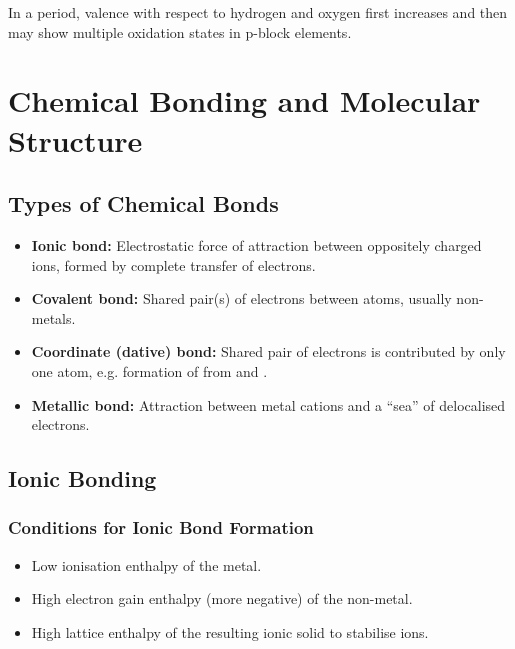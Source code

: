 \documentclass[12pt,a4paper]{article}
\begin{document}
In a period, valence with respect to hydrogen and oxygen first increases and then may show multiple oxidation states in p-block elements.

\clearpage


\section{Chemical Bonding and Molecular Structure}

\subsection{Types of Chemical Bonds}

\begin{itemize}
    \item \textbf{Ionic bond:} Electrostatic force of attraction between oppositely charged ions, formed by complete transfer of electrons.
    \item \textbf{Covalent bond:} Shared pair(s) of electrons between atoms, usually non-metals.
    \item \textbf{Coordinate (dative) bond:} Shared pair of electrons is contributed by only one atom, e.g. formation of  from  and .
    \item \textbf{Metallic bond:} Attraction between metal cations and a “sea” of delocalised electrons.
\end{itemize}

\subsection{Ionic Bonding}

\subsubsection{Conditions for Ionic Bond Formation}
\begin{itemize}
    \item Low ionisation enthalpy of the metal.
    \item High electron gain enthalpy (more negative) of the non-metal.
    \item High lattice enthalpy of the resulting ionic solid to stabilise ions.
\end{itemize}
\end{document}
